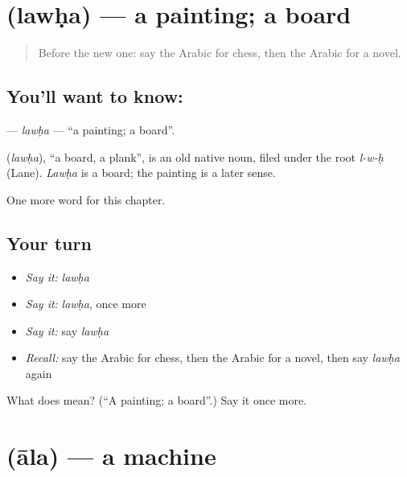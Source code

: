 \section[\texorpdfstring{\ar{لوحة} (lawḥa)}{لوحة (lawḥa)}]{ (lawḥa) — a painting; a board}

\label{lesson:AR-C186-lawha}



\begin{quote}
Before the new one: say the Arabic for chess, then the Arabic for a novel.
\end{quote}

\subsection*{You'll want to know: }
\textbf{} — \emph{lawḥa} — \textquotedblleft{}a painting; a board\textquotedblright{}.

\begin{cousinweb}
\textbf{} (\emph{lawḥa}), \textquotedblleft{}a board, a plank\textquotedblright{}, is an old native noun, filed under the root \emph{l-w-ḥ} (Lane). \emph{Lawḥa} is a board; the painting is a later sense.
\end{cousinweb}

\begin{grammarlens}[title={What you've built}]
One more word for this chapter.
\end{grammarlens}

\subsection*{Your turn}
\begin{itemize}
\raggedright
  \item \emph{Say it:} \emph{lawḥa}
  \item \emph{Say it:} \emph{lawḥa}, once more
  \item \emph{Say it:} say \emph{lawḥa}
  \item \emph{Recall:} say the Arabic for chess, then the Arabic for a novel, then say \emph{lawḥa} again
\end{itemize}

\begin{tcolorbox}[breakable,colback=teal!4,colframe=teal!35!black,title={Before you move on}]
What does  mean? (\textquotedblleft{}A painting; a board\textquotedblright{}.) Say it once more.
\end{tcolorbox}
\section[\texorpdfstring{\ar{آلة} (āla)}{آلة (āla)}]{ (āla) — a machine}


